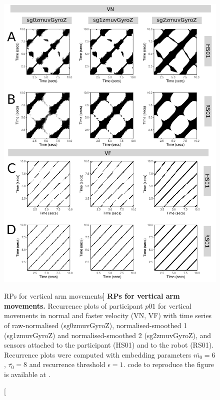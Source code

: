 \begin{figure}
\centering
\includegraphics[height=0.80\textheight]{fig_6_07}
\caption
	[RPs for vertical arm movements]{
	{\bf RPs for vertical arm movements.}	
	Recurrence plots %
	of participant $p01$ for vertical movements in normal and faster 
	velocity (VN, VF) with time series of raw-normalised (sg0zmuvGyroZ), 
	normalised-smoothed 1 (sg1zmuvGyroZ) and 
	normalised-smoothed 2 (sg2zmuvGyroZ), and 
	sensors attached to the participant (HS01) and to the robot (RS01).
	Recurrence plots were computed with 
	embedding parameters $\overline{m_0}=6$, $\overline{\tau_0}=8$ and
	recurrence threshold $\epsilon=1$.
	\R code to reproduce the figure is available at 
	.
        }
    \label{fig:rp_aV}
\end{figure}

